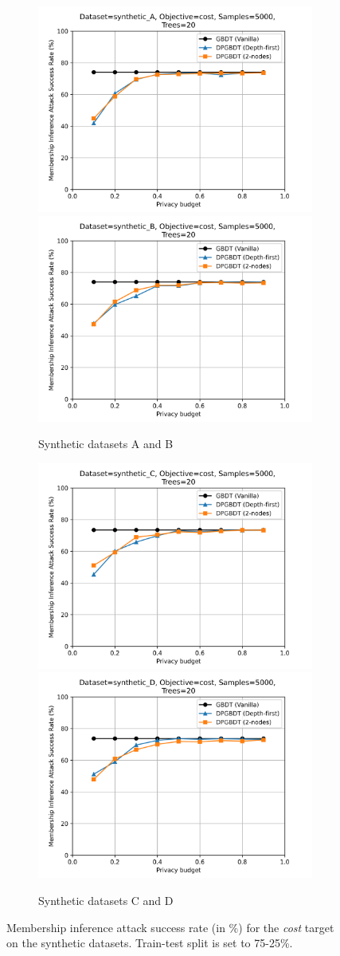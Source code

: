 \begin{figure}[h!]
  \begin{subfigure}{\linewidth}
  \includegraphics[width=.5\linewidth]{images/evaluation/attack_synthetic_A_cost_5000.png}\hfill
  \includegraphics[width=.5\linewidth]{images/evaluation/attack_synthetic_B_cost_5000.png}
  \caption{Synthetic datasets A and B}
  \end{subfigure}\par\medskip
  \begin{subfigure}{\linewidth}
  \includegraphics[width=.5\linewidth]{images/evaluation/attack_synthetic_C_cost_5000.png}\hfill
  \includegraphics[width=.5\linewidth]{images/evaluation/attack_synthetic_D_cost_5000.png}
  \caption{Synthetic datasets C and D}
  \end{subfigure}
  \caption{\label{fig:attack_cost}Membership inference attack success rate (in $\%$) for the \textit{cost} target on the synthetic datasets. Train-test split is set to 75-25\%.}
\end{figure}

